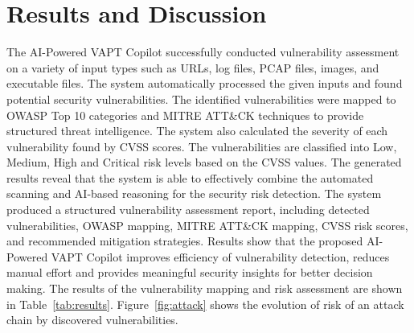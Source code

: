 \documentclass[journal]{IEEEtran}
\begin{document}
\section{Results and Discussion}
The AI-Powered VAPT Copilot successfully conducted vulnerability assessment on a variety of input types such as URLs, log files, PCAP files, images, and executable files. The system automatically processed the given inputs and found potential security vulnerabilities. The identified vulnerabilities were mapped to OWASP Top 10 categories and MITRE ATT\&CK techniques to provide structured threat intelligence. The system also calculated the severity of each vulnerability found by CVSS scores. The vulnerabilities are classified into Low, Medium, High and Critical risk levels based on the CVSS values. The generated results reveal that the system is able to effectively combine the automated scanning and AI-based reasoning for the security risk detection. The system produced a structured vulnerability assessment report, including detected vulnerabilities, OWASP mapping, MITRE ATT\&CK mapping, CVSS risk scores, and recommended mitigation strategies. Results show that the proposed AI-Powered VAPT Copilot improves efficiency of vulnerability detection, reduces manual effort and provides meaningful security insights for better decision making. The results of the vulnerability mapping and risk assessment are shown in Table~\ref{tab:results}. Figure~\ref{fig:attack} shows the evolution of risk of an attack chain by discovered vulnerabilities.

\begin{table}[H]
\centering
\caption{Vulnerability Mapping and Risk Assessment Methodology}
\footnotesize
{}
\label{tab:results}
\end{table}
\end{document}
